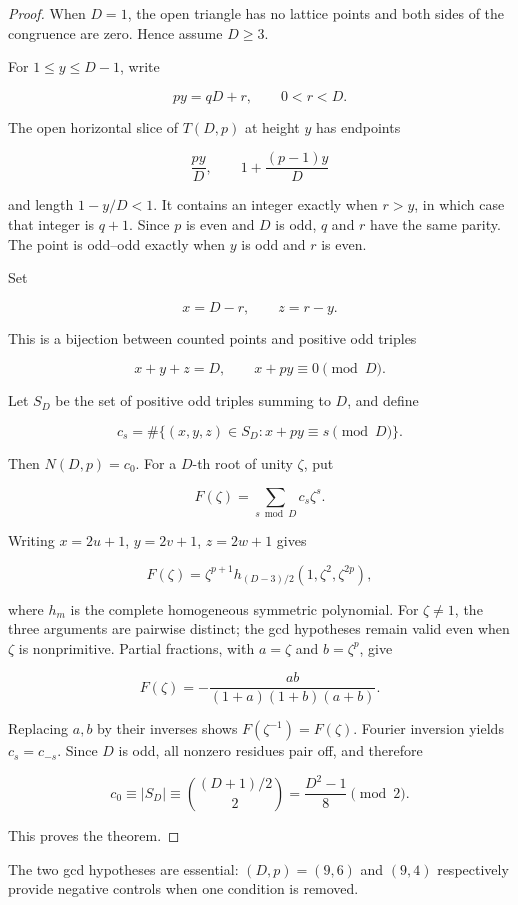 \documentclass[11pt]{article}
\theoremstyle{remark}
\numberwithin{equation}{section}
\begin{document}
\begin{proof}

When $D=1$, the open triangle has no lattice points and both sides of the
congruence are zero. Hence assume $D\ge3$.

For $1\le y\le D-1$, write

\[
py=qD+r,\qquad0<r<D.
\]

The open horizontal slice of $T(D,p)$ at height $y$ has endpoints

\[
\frac{py}{D},\qquad1+\frac{(p-1)y}{D}
\]

and length $1-y/D<1$. It contains an integer exactly when $r>y$, in which case that integer is $q+1$. Since $p$ is even and $D$ is odd, $q$ and $r$ have the same parity. The point is odd--odd exactly when $y$ is odd and $r$ is even.

Set

\[
x=D-r,\qquad z=r-y.
\]

This is a bijection between counted points and positive odd triples

\[
x+y+z=D,\qquad x+py\equiv0\pmod D.
\]

Let $S_D$ be the set of positive odd triples summing to $D$, and define

\[
c_s=\#\{(x,y,z)\in S_D:x+py\equiv s\pmod D\}.
\]

Then $N(D,p)=c_0$. For a $D$-th root of unity $\zeta$, put

\[
F(\zeta)=\sum_{s\bmod D}c_s\zeta^s.
\]

Writing $x=2u+1$, $y=2v+1$, $z=2w+1$ gives

\[
F(\zeta)=\zeta^{p+1}h_{(D-3)/2}(1,\zeta^2,\zeta^{2p}),
\]

where $h_m$ is the complete homogeneous symmetric polynomial. For $\zeta\ne1$, the three arguments are pairwise distinct; the gcd hypotheses remain valid even when $\zeta$ is nonprimitive. Partial fractions, with $a=\zeta$ and $b=\zeta^p$, give

\[
F(\zeta)=-\frac{ab}{(1+a)(1+b)(a+b)}.
\]

Replacing $a,b$ by their inverses shows $F(\zeta^{-1})=F(\zeta)$. Fourier inversion yields $c_s=c_{-s}$. Since $D$ is odd, all nonzero residues pair off, and therefore

\[
c_0\equiv|S_D|\equiv\binom{(D+1)/2}{2}
=\frac{D^2-1}{8}\pmod2.
\]

This proves the theorem.
\end{proof}


The two gcd hypotheses are essential: $(D,p)=(9,6)$ and $(9,4)$ respectively provide negative controls when one condition is removed.
\end{document}
